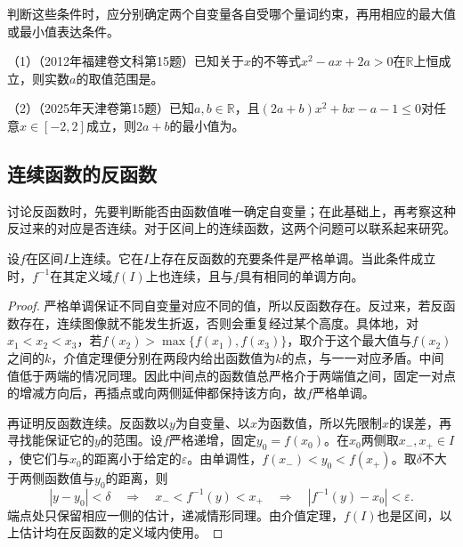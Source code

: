 判断这些条件时，应分别确定两个自变量各自受哪个量词约束，再用相应的最大值或最小值表达条件。

\begin{exercise}
\mbox{}\par\nobreak

（1）（2012年福建卷文科第15题）已知关于\(x\)的不等式\(x^2-ax+2a>0\)在\(\mathbb R\)上恒成立，则实数\(a\)的取值范围是\underline{\hspace{1.5cm}}。

（2）（2025年天津卷第15题）已知\(a,b\in\mathbb R\)，且\((2a+b)x^2+bx-a-1\le0\)对任意\(x\in[-2,2]\)成立，则\(2a+b\)的最小值为\underline{\hspace{1.2cm}}。
\end{exercise}

\endgroup
\begingroup
\setlength{\parskip}{3pt}
\subsection{连续函数的反函数}
\label{subsec:functions-continuous-inverse}

讨论反函数时，先要判断能否由函数值唯一确定自变量；在此基础上，再考察这种反过来的对应是否连续。对于区间上的连续函数，这两个问题可以联系起来研究。

\begin{theorem}\label{thm:inv-mono}
设\(f\)在区间\(I\)上连续。它在\(I\)上存在反函数的充要条件是严格单调。当此条件成立时，\(f^{-1}\)在其定义域\(f(I)\)上也连续，且与\(f\)具有相同的单调方向。
\end{theorem}

\begin{proof}
严格单调保证不同自变量对应不同的值，所以反函数存在。反过来，若反函数存在，连续图像就不能发生折返，否则会重复经过某个高度。具体地，对\(x_1<x_2<x_3\)，若\(f(x_2)>\max\{f(x_1),f(x_3)\}\)，取介于这个最大值与\(f(x_2)\)之间的\(k\)，介值定理便分别在两段内给出函数值为\(k\)的点，与一一对应矛盾。中间值低于两端的情况同理。因此中间点的函数值总严格介于两端值之间，固定一对点的增减方向后，再插点或向两侧延伸都保持该方向，故\(f\)严格单调。

再证明反函数连续。反函数以\(y\)为自变量、以\(x\)为函数值，所以先限制\(x\)的误差，再寻找能保证它的\(y\)的范围。设\(f\)严格递增，固定\(y_0=f(x_0)\)。在\(x_0\)两侧取\(x_-,x_+\in I\)，使它们与\(x_0\)的距离小于给定的\(\varepsilon\)。由单调性，\(f(x_-)<y_0<f(x_+)\)。取\(\delta\)不大于两侧函数值与\(y_0\)的距离，则
\begin{equation*}
 |y-y_0|<\delta\quad\Longrightarrow\quad
 x_-<f^{-1}(y)<x_+\quad\Longrightarrow\quad
 |f^{-1}(y)-x_0|<\varepsilon.
\end{equation*}
端点处只保留相应一侧的估计，递减情形同理。由介值定理，\(f(I)\)也是区间，以上估计均在反函数的定义域内使用。
\end{proof}

